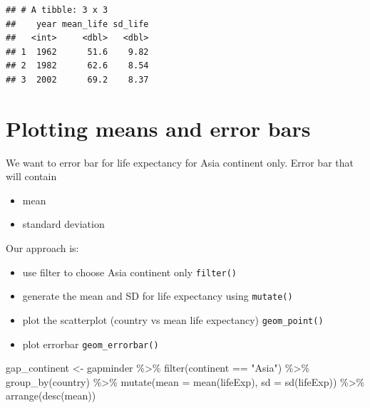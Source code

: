 \documentclass[
  10pt,
]{krantz}
\newenvironment{Shaded}{\begin{snugshade}}{\end{snugshade}}
\newcommand{\AttributeTok}[1]{\textcolor[rgb]{0.77,0.63,0.00}{#1}}
\newcommand{\FunctionTok}[1]{\textcolor[rgb]{0.00,0.00,0.00}{#1}}
\newcommand{\NormalTok}[1]{#1}
\newcommand{\OtherTok}[1]{\textcolor[rgb]{0.56,0.35,0.01}{#1}}
\newcommand{\SpecialCharTok}[1]{\textcolor[rgb]{0.00,0.00,0.00}{#1}}
\newcommand{\StringTok}[1]{\textcolor[rgb]{0.31,0.60,0.02}{#1}}
\providecommand{\tightlist}{%
  \setlength{\itemsep}{0pt}\setlength{\parskip}{0pt}}
\begin{document}
\begin{verbatim}
## # A tibble: 3 x 3
##    year mean_life sd_life
##   <int>     <dbl>   <dbl>
## 1  1962      51.6    9.82
## 2  1982      62.6    8.54
## 3  2002      69.2    8.37
\end{verbatim}

\hypertarget{plotting-means-and-error-bars}{%
\section{\texorpdfstring{Plotting means and error bars}{Plotting means and error bars}}\label{plotting-means-and-error-bars}}

We want to error bar for life expectancy for Asia continent only. Error bar that will contain

\begin{itemize}
\tightlist
\item
  mean
\item
  standard deviation
\end{itemize}

Our approach is:

\begin{itemize}
\tightlist
\item
  use filter to choose Asia continent only \texttt{filter()}
\item
  generate the mean and SD for life expectancy using \texttt{mutate()}
\item
  plot the scatterplot (country vs mean life expectancy) \texttt{geom\_point()}
\item
  plot errorbar \texttt{geom\_errorbar()}
\end{itemize}

\begin{Shaded}
\begin{Highlighting}[]
\NormalTok{gap\_continent }\OtherTok{\textless{}{-}}\NormalTok{ gapminder }\SpecialCharTok{\%\textgreater{}\%} \FunctionTok{filter}\NormalTok{(continent }\SpecialCharTok{==} \StringTok{"Asia"}\NormalTok{) }\SpecialCharTok{\%\textgreater{}\%}
  \FunctionTok{group\_by}\NormalTok{(country) }\SpecialCharTok{\%\textgreater{}\%} \FunctionTok{mutate}\NormalTok{(}\AttributeTok{mean =} \FunctionTok{mean}\NormalTok{(lifeExp), }\AttributeTok{sd =} \FunctionTok{sd}\NormalTok{(lifeExp)) }\SpecialCharTok{\%\textgreater{}\%}
  \FunctionTok{arrange}\NormalTok{(}\FunctionTok{desc}\NormalTok{(mean))}
\end{Highlighting}
\end{Shaded}
\end{document}
